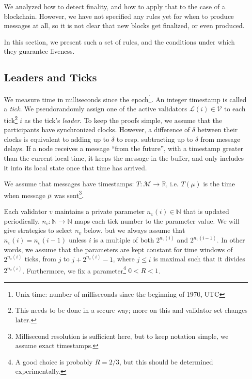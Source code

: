 \documentclass[12pt]{article}
\begin{document}
We analyzed how to detect finality, and how to apply that to the case of a blockchain. However, we have not specified any rules yet for when to produce messages at all, so it is not clear that new blocks get finalized, or even produced.

In this section, we present such a set of rules, and the conditions under which they guarantee liveness.


\subsection{Leaders and Ticks}

We measure time in milliseconds since the epoch\footnote{Unix time: number of milliseconds since the beginning of 1970, UTC}. An integer timestamp is called a \emph{tick}. We pseudorandomly assign one of the active validators $\mathcal{L}(i) \in \mathcal{V}$ to each tick\footnote{This needs to be done in a secure way; more on this and validator set changes later.} $i$ as the tick's \emph{leader}. To keep the proofs simple, we assume that the participants have synchronized clocks. However, a difference of $\delta$ between their clocks is equivalent to adding up to $\delta$ to resp. subtracting up to $\delta$ from message delays. If a node receives a message ``from the future'', with a timestamp greater than the current local time, it keeps the message in the buffer, and only includes it into its local state once that time has arrived.

We assume that messages have timestamps: $T: \mathcal{M} \rightarrow \mathbb{R}$, i.e. $T(\mu)$ is the time when message $\mu$ was sent\footnote{Millisecond resolution is sufficient here, but to keep notation simple, we assume exact timestamps.}.

Each validator $v$ maintains a private parameter $n_v(i) \in \mathbb{N}$ that is updated periodically. $n_v: \mathbb{N} \rightarrow \mathbb{N}$ maps each tick number to the parameter value. We will give strategies to select $n_v$ below, but we always assume that $n_v (i) = n_v (i - 1)$ unless $i$ is a multiple of both $2^{n_v(i)}$ and $2^{n_v(i-1)}$. In other words, we assume that the parameters are kept constant for time windows of $2^{n_v(i)}$ ticks, from $j$ to $j + 2^{n_v(i)} - 1$, where $j \leq i$ is maximal such that it divides $2^{n_v(i)}$. Furthermore, we fix a parameter\footnote{A good choice is probably $R = 2/3$, but this should be determined experimentally.} $0 < R < 1$.
\end{document}
